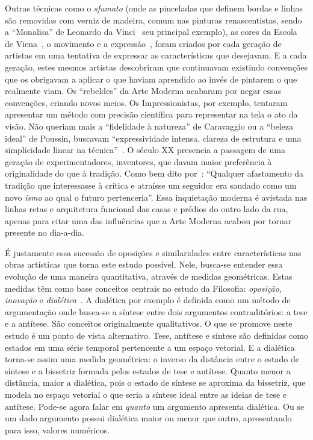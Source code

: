 Outras técnicas como o \textit{sfumato} (onde as pinceladas que
definem bordas e linhas são removidas com verniz de madeira, comum nas
pinturas renascentistas, sendo a ``Monalisa'' de Leonardo da
Vinci~\cite{pegus, hall} seu principal exemplo), as cores da Escola de
Viena~\cite{gardner}, o movimento e a expressão~\cite{gombrich,
  gordon}, foram criados por cada geração de artistas em uma tentativa
de expressar as características que desejavam. E a cada geração, estes
mesmos artistas descobriram que continuavam existindo convenções que
os obrigavam a aplicar o que haviam aprendido ao invés de pintarem o
que realmente viam. Os ``rebeldes'' da Arte Moderna acabaram por negar
essas convenções, criando novos meios. Os Impressionistas, por
exemplo, tentaram apresentar um método com precisão científica para
representar na tela o ato da visão. Não queriam mais a ``fidelidade à
natureza'' de Caravaggio ou a ``beleza ideal'' de Poussin, buscavam
``expressividade intensa, clareza de estrutura e uma simplicidade
linear na técnica''~\cite{gombrich}. O século XX presencia a passagem
de uma geração de experimentadores, inventores, que davam maior
preferência à originalidade do que à tradição. Como bem dito
por~\citeauthor{gombrich}: ``Qualquer afastamento da tradição que
interessasse à crítica e atraísse um seguidor era saudado como um novo
\emph{ismo} ao qual o futuro pertenceria''. Essa inquietação moderna é
avistada nas linhas retas e arquitetura funcional das casas e prédios
do outro lado da rua, apenas para citar uma das influências que a Arte
Moderna acabou por tornar presente no dia-a-dia.

É justamente essa sucessão de oposições e similaridades entre
características nas obras artísticas que torna este estudo
possível. Nele, busca-se entender essa evolução de uma maneira
quantitativa, através de medidas geométricas. Estas medidas têm como
base conceitos centrais no estudo da Filosofia: \textit{oposição},
\textit{inovação} e \textit{dialética}~\cite{deleuze,pinto,van}. A
dialética por exemplo é definida como um método de argumentação onde
busca-se a síntese entre dois argumentos contraditórios: a tese e a
antítese. São conceitos originalmente qualitativos. O que se promove
neste estudo é um ponto de vista alternativo. Tese, antítese e síntese
são definidas como estados em uma série temporal pertencente a um
espaço vetorial. E a dialética torna-se assim uma medida geométrica: o
inverso da distância entre o estado de síntese e a bissetriz formada
pelos estados de tese e antítese. Quanto menor a distância, maior a
dialética, pois o estado de síntese se aproxima da bissetriz, que
modela no espaço vetorial o que seria a síntese ideal entre as ideias
de tese e antítese. Pode-se agora falar em \emph{quanto} um argumento
apresenta dialética. Ou se um dado argumento possui dialética maior ou
menor que outro, apresentando para isso, valores numéricos.

